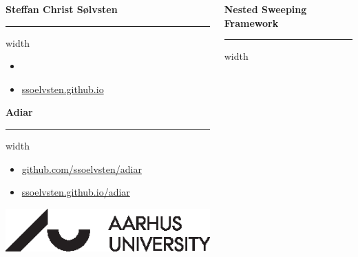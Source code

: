 \documentclass[english, aspectratio=169]{beamer}
\begin{document}
\begin{frame}
  \begin{columns}
    \begin{column}{0.42\linewidth}
      {\Large \textbf{Steffan Christ S{\o}lvsten}}
      \vspace{1pt} {\hrule width\linewidth}

      \vspace{5pt}

      \begin{itemize}
      \item[\faIcon{envelope}] 
      \item[\faIcon{globe}] \href{https://ssoelvsten.github.io}{ssoelvsten.github.io}
      \end{itemize}

      \vspace{10pt}

      {\Large \textbf{Adiar}}
      \vspace{1pt} {\hrule width\linewidth}

      \vspace{5pt}

      \begin{itemize}
      \item[\faIcon{code}]
        \href{http://github.com/ssoelvsten/adiar}{github.com/ssoelvsten/adiar}
      \item[\faIcon{book}\hspace{2pt}]
        \href{http://ssoelvsten.github.io/adiar}{ssoelvsten.github.io/adiar}
      \end{itemize}

      \vspace{12pt}

      \includegraphics[width=0.5\linewidth]{external/aulogo_uk_var2_black.eps}
    \end{column}
    \begin{column}{0.58\linewidth}

      {\Large \textbf{Nested Sweeping Framework}}
      \vspace{1pt} {\hrule width\linewidth}

      \vspace{5pt}


\end{column}
\end{columns}
\end{frame}
\end{document}
